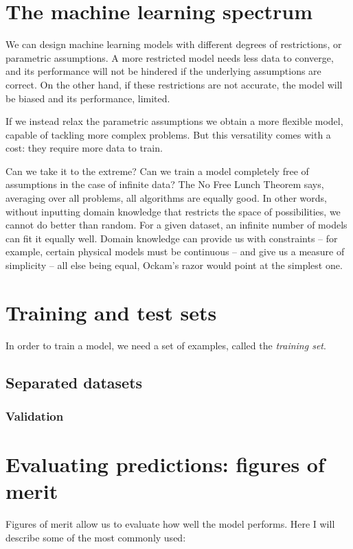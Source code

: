 \section{The machine learning spectrum}
We can design machine learning models with different degrees of restrictions, or parametric assumptions.
A more restricted model needs less data to converge, and its performance will not be hindered if the underlying assumptions are correct.
On the other hand, if these restrictions are not accurate, the model will be biased and its performance, limited.

If we instead relax the parametric assumptions we obtain a more flexible model, capable of tackling more complex problems.
But this versatility comes with a cost: they require more data to train.

Can we take it to the extreme?
Can we train a model completely free  of assumptions in the case of infinite data? The No Free Lunch Theorem \citep{no_free_lunch} says, averaging over all problems, all algorithms are equally good.
In other words, without inputting domain knowledge that restricts the space of possibilities, we cannot do better than random.
For a given dataset, an infinite number of models can fit it equally well.
Domain knowledge can provide us with constraints -- for example, certain physical models must be continuous -- and give us a measure of simplicity -- all else being equal, Ockam's razor would point at the simplest one.

\section{Training and test sets}
In order to train a model, we need a set of examples, called the \emph{training set}.
\subsection{Separated datasets}
\subsubsection{Validation}

\section{Evaluating predictions: figures of merit}
Figures of merit allow us to evaluate how well the model performs.
Here I will describe some of the most commonly used:

